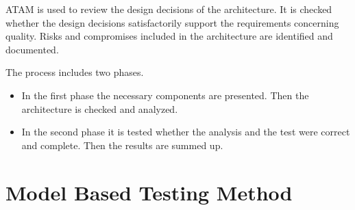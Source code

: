ATAM \cite{ATAM} is used to review the design decisions of the architecture. 
It is checked whether the design decisions satisfactorily 
support the requirements concerning quality. Risks and 
compromises included in the architecture are identified 
and documented.

The process includes two phases. 
\begin{itemize}
\item In the first phase the necessary components 
	are presented. Then the architecture is checked and analyzed. 
\item In the second phase it is tested whether the analysis 
	and the test were correct and complete. Then the 
	results are summed up.
\end{itemize}

\chapter{Model Based Testing Method}
\label{subsec:mbt}
